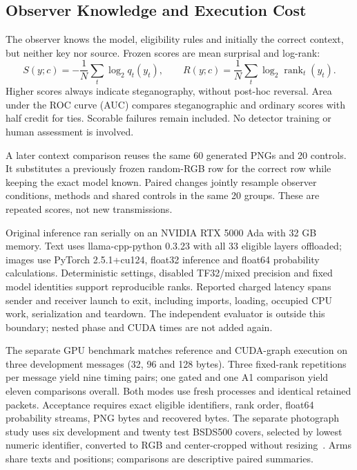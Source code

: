 \documentclass[orivec]{llncs}
\newcommand{\rank}{\operatorname{rank}}
\begin{document}
\subsection{Observer Knowledge and Execution Cost}
The observer knows the model, eligibility rules and initially the correct context, but neither key nor source. Frozen scores are mean surprisal and log-rank:
\begin{equation}
S(y;c)=-\frac{1}{N}\sum_t\log_2q_t(y_t),\qquad
R(y;c)=\frac{1}{N}\sum_t\log_2\rank_t(y_t).
\end{equation}
Higher scores always indicate steganography, without post-hoc reversal. Area under the ROC curve (AUC) compares steganographic and ordinary scores with half credit for ties. Scorable failures remain included. No detector training or human assessment is involved.

A later context comparison reuses the same 60 generated PNGs and 20 controls. It substitutes a previously frozen random-RGB row for the correct row while keeping the exact model known. Paired changes jointly resample observer conditions, methods and shared controls in the same 20 groups. These are repeated scores, not new transmissions.

Original inference ran serially on an NVIDIA RTX 5000 Ada with 32 GB memory. Text uses llama-cpp-python 0.3.23 with all 33 eligible layers offloaded; images use PyTorch 2.5.1+cu124, float32 inference and float64 probability calculations. Deterministic settings, disabled TF32/mixed precision and fixed model identities support reproducible ranks. Reported charged latency spans sender and receiver launch to exit, including imports, loading, occupied CPU work, serialization and teardown. The independent evaluator is outside this boundary; nested phase and CUDA times are not added again.

The separate GPU benchmark matches reference and CUDA-graph execution on three development messages (32, 96 and 128 bytes). Three fixed-rank repetitions per message yield nine timing pairs; one gated and one A1 comparison yield eleven comparisons overall. Both modes use fresh processes and identical retained packets. Acceptance requires exact eligible identifiers, rank order, float64 probability streams, PNG bytes and recovered bytes. The separate photograph study uses six development and twenty test BSDS500 covers, selected by lowest numeric identifier, converted to RGB and center-cropped without resizing~\cite{bsds}. Arms share texts and positions; comparisons are descriptive paired summaries.
\end{document}
